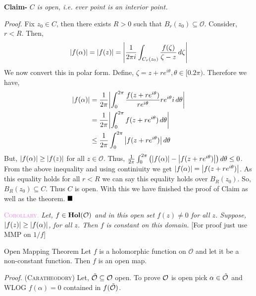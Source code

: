 \documentclass[../ComplexAnalysis_Notes.tex]{subfiles}
\begin{document}
 \vspace*{0.2cm}

 \noindent \textbf{\textsf{Claim- }} \textit{$C$ is open, i.e. ever point is an interior point.}

 \vspace*{0.1cm}

 \noindent \textit{Proof.} Fix $z_0 \in C$, then there exists $R >0$ such that $B_r(z_0) \subseteq \mathcal{O}$. Consider, $r < R$. Then, \[\abs{f(\alpha)}= \abs{f(z)} = \abs{\frac{1}{2\pi i}\int_{C_r(z_0)}\frac{f(\zeta)}{\zeta -z}\, d \zeta}\] We now convert this in polar form. Define, $\zeta = z +re^{i\theta}, \theta \in [0.2\pi)$. Therefore we have, \begin{align*}
  \abs{f(\alpha)} &= \frac{1}{2\pi}\abs{\int_{0}^{2\pi}\frac{f(z+re^{i\theta})}{r e^{i \theta}} re^{i\theta}i \, d \theta} \\
  &= \frac{1}{2\pi} \abs{\int_{0}^{2\pi}f(z+re^{i\theta})\, d\theta} \\
  &\leq \frac{1}{2\pi} \int_{0}^{2\pi}\abs{f(z+re^{i\theta})}\, d\theta
 \end{align*}
\noindent But, $\abs{f(\alpha)}\geq \abs{f(z)}$ for all $z \in \mathcal{O}$. Thus, \(\frac{1}{2\pi}\int_{0}^{2\pi}\qty(\abs{f(\alpha)}-\abs{f(z+re^{i\theta})})\, d \theta \leq 0\). From the above inequality and using continiuity we get $\abs{f(\alpha)}=\abs{f(z+re^{i\theta})}$. As this equality holds for all $r <R$ we can say this equality holds over $B_R(z_0)$. So, $B_R(z_0) \subseteq C$. Thus $C$ is open. With this we have finished the proof of Claim as well as the theorem. $\hfill \blacksquare$

\hspace*{0.2cm}

\hspace*{0.6cm} \textcolor{violet}{\textsc{Corollary}.}  \textit{Let, $f\in \operatorname{\mathbf{Hol}} (\mathcal{O})$ and in this open set $f(z)\neq 0$ for all $z$. Suppose, $\abs{f(z)}\geq \abs{f(\alpha)}$, for all $z$. Then $f$ is constant on this domain.} [For proof just use MMP on $1/{f}$]

\begin{Thm}{Open Mapping Theorem}{}
  Let $f$ is a holomorphic function on $\mathcal{O}$ and let it be a non-constant function. Then $f$ is an open map.
\end{Thm}

\noindent \textit{Proof.} (\textsc{Caratheodory}) Let, $\tilde{\mathcal{O}} \subseteq \mathcal{O}$ open. To prove $\mathcal{O}$ is open pick $\alpha \in \tilde{\mathcal{O}}$ and WLOG $f(\alpha)=0$ contained in $f(\tilde{\mathcal{O}})$.
\end{document}
